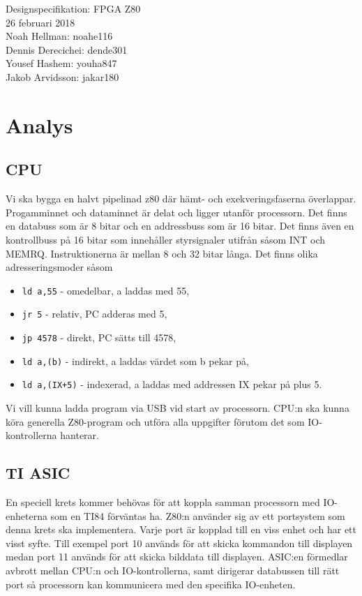 \documentclass[12pt]{article}
\begin{document}
\begin{center}
\vspace*{15mm}
{\Huge Designspecifikation: FPGA Z80}\\
\vspace{15mm}
{\large 26 februari 2018}\\
\vspace{15mm}
Noah Hellman: noahe116 \\
Dennis Derecichei: dende301 \\
Yousef Hashem: youha847 \\
Jakob Arvidsson: jakar180 \\
\end{center}

\vspace{2cm}
\tableofcontents
\newpage

\section{Analys}
\subsection{CPU}
Vi ska bygga en halvt pipelinad z80 där hämt- och exekveringsfaserna
överlappar. Progamminnet och dataminnet är delat och ligger utanför processorn.
Det finns en databuss som är 8 bitar och en addressbuss som är 16 bitar. Det
finns även en kontrollbuss på 16 bitar som innehåller styrsignaler utifrån såsom
INT och MEMRQ. Instruktionerna är mellan 8 och 32 bitar långa. Det finns olika
adresseringsmoder såsom
\begin{itemize}
    \item \texttt{ld a,55} - omedelbar, a laddas med 55,
    \item \texttt{jr 5} - relativ, PC adderas med 5,
    \item \texttt{jp 4578} - direkt, PC sätts till 4578,
    \item \texttt{ld a,(b)} - indirekt, a laddas värdet som b pekar på,
    \item \texttt{ld a,(IX+5)} - indexerad, a laddas med addressen IX pekar på
        plus 5.
\end{itemize}
Vi vill kunna ladda program via USB vid start av processorn. CPU:n ska kunna
köra generella Z80-program och utföra alla uppgifter förutom det som
IO-kontrollerna hanterar.

\subsection{TI ASIC}
En speciell krets kommer behövas för att koppla samman processorn med
IO-enheterna som en TI84 förväntas ha. Z80:n använder sig av ett portsystem som
denna krets ska implementera. Varje port är kopplad till en viss enhet och har
ett visst syfte. Till exempel port 10 används för att skicka kommandon till
displayen medan port 11 används för att skicka bilddata till displayen. ASIC:en
förmedlar avbrott mellan CPU:n och IO-kontrollerna, samt dirigerar databussen
till rätt port så processorn kan kommunicera med den specifika IO-enheten.
\end{document}
